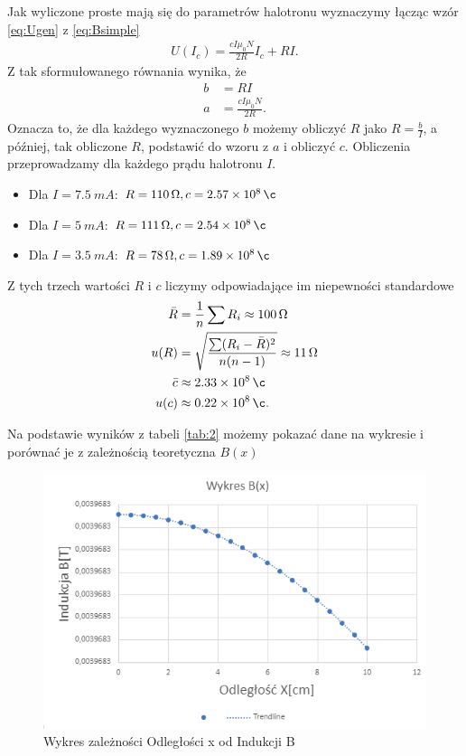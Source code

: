 \documentclass{article}
\begin{document}
Jak wyliczone proste mają się do parametrów halotronu wyznaczymy
łącząc wzór \eqref{eq:Ugen} z \eqref{eq:Bsimple}
\begin{align}
    U(I_c) = \frac{cI\mu_0N}{2R}I_c + RI.
\end{align}
Z tak sformułowanego równania wynika, że 
\begin{align*}
    b &= RI \\
    a &= \frac{cI\mu_0 N}{2R}.
\end{align*}
Oznacza to, że dla każdego wyznaczonego $b$ możemy obliczyć $R$ jako
$R = \frac{b}{I}$, a później, tak obliczone $R$, podstawić do wzoru
z $a$ i obliczyć $c$. Obliczenia przeprowadzamy dla każdego prądu halotronu $I$.
\begin{itemize}
    \item Dla $I = \SI{7.5}{mA}$: $R = \SI{110}{\Omega}, c = \SI{2.57e8}{\c}$
    \item Dla $I = \SI{5}{mA}$: $R = \SI{111}{\Omega}, c = \SI{2.54e8}{\c}$
    \item Dla $I = \SI{3.5}{mA}$: $R = \SI{78}{\Omega}, c = \SI{1.89e8}{\c}$
\end{itemize}
Z tych trzech wartości $R$ i $c$ liczymy odpowiadające im niepewności
standardowe
\begin{align*}
    \bar{R} &= \frac{1}{n}\sum R_i \approx \SI{100}{\Omega} \\
    u(R) &= \sqrt{\frac{\sum(R_i - \bar{R})^2}{n(n - 1)}} \approx \SI{11}{\Omega} \\
    \bar{c} &\approx \SI{2.33e8}{\c} \\
    u(c) &\approx \SI{0.22e8}{\c}.
\end{align*}

Na podstawie wyników z tabeli \ref{tab:2} możemy pokazać dane na wykresie i porównać je z zależnością teoretyczna $B(x)$
\begin{figure}[H]
    \centering
    \includegraphics[scale=0.8]{cw43/wykres.png}
    \caption{Wykres zależności Odległości x od Indukcji B}
    \label{fig:fig2}
\end{figure}
\end{document}
